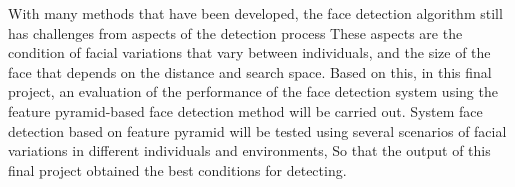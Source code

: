 With many methods that have been developed, the face detection algorithm still has challenges from aspects of the detection process
These aspects are the condition of facial variations that vary between individuals, and the size of the face that depends on the distance and search space\citep{Li_2015_CVPR}.
Based on this, in this final project, an evaluation of the performance of the face detection system using the feature pyramid-based face detection method will be carried out. System
face detection based on feature pyramid will be tested using several scenarios of facial variations in different individuals and environments,
So that the output of this final project obtained the best conditions for detecting.
